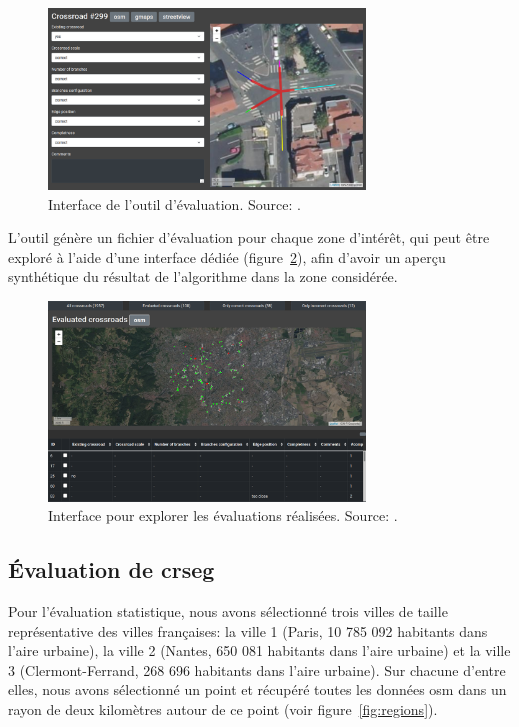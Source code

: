\begin{figure}[ht]
    \centering
    \includegraphics[width=0.75\textwidth]{images/evaluation/evaluation-xxx.png}
    \caption[Interface de l'outil d'évaluation]{Interface de l'outil d'évaluation. Source: \citep{Favreau2022}.}
    \label{fig:evaluationTool}
\end{figure}

\newpar{}

L'outil génère un fichier d'évaluation pour chaque zone d'intérêt, qui peut être exploré à l'aide d'une interface dédiée (figure~\ref{fig:explorer}), afin d'avoir un aperçu synthétique du résultat de l'algorithme dans la zone considérée.

\begin{figure}[ht]
    \centering
    \includegraphics[width=0.75\textwidth]{images/evaluation/eval-browser-xxx.png}
    \caption[Interface pour explorer les évaluations réalisées]{Interface pour explorer les évaluations réalisées. Source: \citep{Favreau2022}.}
    \label{fig:explorer}
\end{figure}

\subsection{Évaluation de crseg}

Pour l'évaluation statistique, nous avons sélectionné trois villes de taille représentative des villes françaises: la ville 1 (Paris, 10 785 092 habitants dans l'aire urbaine), la ville 2 (Nantes, 650 081 habitants dans l'aire urbaine) et la ville 3 (Clermont-Ferrand, 268 696 habitants dans l'aire urbaine). Sur chacune d'entre elles, nous avons sélectionné un point et récupéré toutes les données \gls{osm} dans un rayon de deux kilomètres autour de ce point (voir figure~\ref{fig:regions}).


